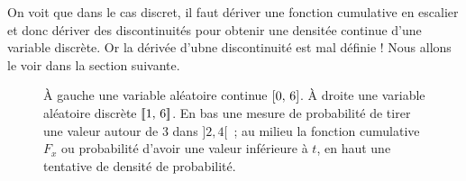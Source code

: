 On voit que dans le cas discret, il faut dériver une fonction
cumulative \og{} en escalier \fg{} et donc dériver des discontinuités
pour obtenir une densitée continue d'une variable discrète. Or la
dérivée d'ubne discontinuité est mal définie ! Nous allons le voir
dans la section suivante.

\clearpage

\begin{figure}[ht!]\centering
  \caption{À gauche une variable aléatoire continue ${\left[0,\,6\right]}$. À
    droite une variable aléatoire discrète ${[\![ 1,\,6]\!]}$. En bas une
    mesure de probabilité de tirer une valeur autour de 3 dans
    $]2, 4[$~; au milieu la fonction cumulative $F_x$ ou probabilité
    d'avoir une valeur inférieure à $t$, en haut une tentative de
    densité de probabilité.}
  \label{fig:densites}
\end{figure}
  
